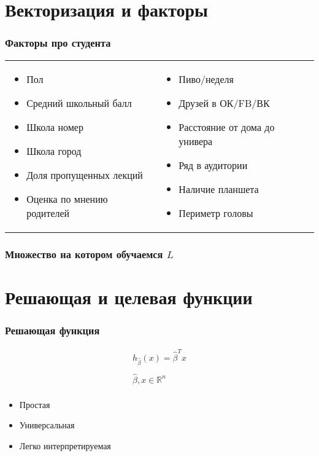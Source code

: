 \documentclass[14pt, fleqn, xcolor={dvipsnames, table}, hyperref={unicode}, babel={english,russian}, inputenc=utf8x]{beamer}
\begin{document}
\section{Векторизация и факторы}
\begin{frame}
\frametitle{Факторы про студента}
\small
\begin{center}
\begin{tabular}{p{}p{}}
\begin{itemize}
  \item Пол
  \item Средний школьный балл
  \item Школа номер
  \item Школа город
  \item Доля пропущенных лекций
  \item Оценка по мнению родителей
\end{itemize} &
\begin{itemize}
  \item Пиво/неделя
  \item Друзей в ОК/FB/ВК
  \item Расстояние от дома до универа
  \item Ряд в аудитории
  \item Наличие планшета
  \item Периметр головы
\end{itemize}
\end{tabular}
\end{center}
\end{frame}
\begin{frame}[t]\frametitle{Множество на котором обучаемся $L$}
\tiny
    \DTLsetseparator{,}
    \renewcommand\dtlstringalign{p{4.5em}}
    \renewcommand\dtlrealalign{p{1.5em}}
    \renewcommand\dtlintalign{p{1.5em}}
    \renewcommand\dtldisplayvalign{c}
    \renewcommand\dtldisplayafterhead{\hline\\}
    
\end{frame}

\section{Решающая и целевая функции}
\begin{frame}[t]\frametitle{Решающая функция}
    $$\begin{array}{c}
      h_{\hat{\beta}}(x) = \hat{\beta}^{T}x \\
      \\
      \hat{\beta}, x \in \mathbb{R}^n \\
      \end{array}
    $$
\begin{itemize}
  \item Простая
  \item Универсальная
  \item Легко интерпретируемая
\end{itemize}
\end{frame}
\end{document}
